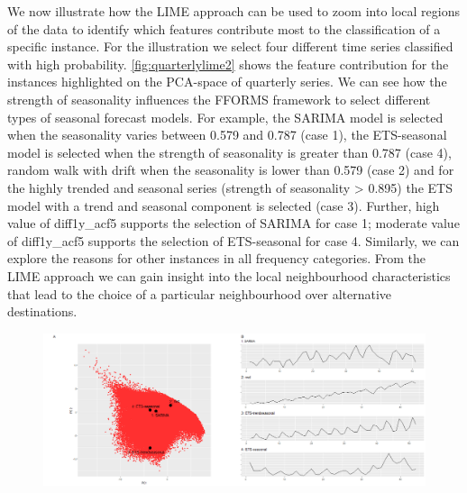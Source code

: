 \documentclass[11pt,a4paper,]{article}
\begin{document}
We now illustrate how the LIME approach can be used to zoom into local regions of the data to identify which features contribute most to the classification of a specific instance. For the illustration we select four different time series classified with high probability. \autoref{fig:quarterlylime2} shows the feature contribution for the instances highlighted on the PCA-space of quarterly series. We can see how the strength of seasonality influences the FFORMS framework to select different types of seasonal forecast models. For example, the SARIMA model is selected when the seasonality varies between 0.579 and 0.787 (case 1), the ETS-seasonal model is selected when the strength of seasonality is greater than 0.787 (case 4), random walk with drift when the seasonality is lower than 0.579 (case 2) and for the highly trended and seasonal series (strength of seasonality \textgreater{} 0.895) the ETS model with a trend and seasonal component is selected (case 3). Further, high value of diff1y\_acf5 supports the selection of SARIMA for case 1; moderate value of diff1y\_acf5 supports the selection of ETS-seasonal for case 4. Similarly, we can explore the reasons for other instances in all frequency categories. From the LIME approach we can gain insight into the local neighbourhood characteristics that lead to the choice of a particular neighbourhood over alternative destinations.

\begin{figure}[h]

{\centering \includegraphics{figures/quarterlylime-1} 

}

\end{figure}
\end{document}

